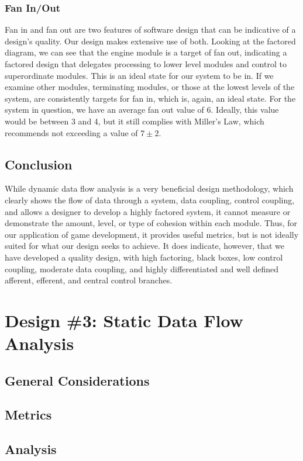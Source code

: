 \documentclass{article}
\begin{document}
		\subsubsection{Fan In/Out}
			Fan in and fan out are two features of software design that can be indicative of a design's quality. Our design makes extensive use of both. Looking at the factored diagram, we can see that the engine module is a target of fan out, indicating a factored design that delegates processing to lower level modules and control to superordinate modules. This is an ideal state for our system to be in. If we examine other modules, terminating modules, or those at the lowest levels of the system, are consistently targets for fan in, which is, again, an ideal state. For the system in question, we have an average fan out value of 6. Ideally, this value would be between 3 and 4, but it still complies with Miller's Law, which recommends not exceeding a value of $7\pm2$. 
	\subsection{Conclusion}
		While dynamic data flow analysis is a very beneficial design methodology, which clearly shows the flow of data through a system, data coupling, control coupling, and allows a designer to develop a highly factored system, it cannot measure or demonstrate the amount, level, or type of cohesion within each module. Thus, for our application of game development, it provides useful metrics, but is not ideally suited for what our design seeks to achieve. It does indicate, however, that we have developed a quality design, with high factoring, black boxes, low control coupling, moderate
data coupling, and highly differentiated and well defined afferent, efferent, and central control branches. 
%
%
\section{Design \#3: Static Data Flow Analysis}
	\subsection{General Considerations}
	\subsection{Metrics}
	\subsection{Analysis}
\end{document}
